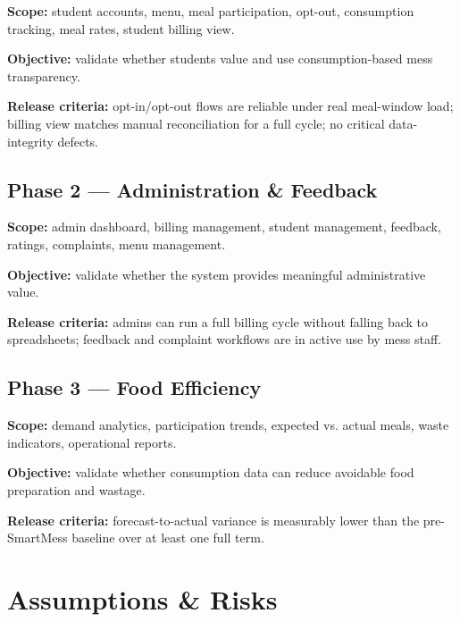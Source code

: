 \documentclass[12pt,a4paper]{article}
\begin{document}
\textbf{Scope:} student accounts, menu, meal participation, opt-out,
consumption tracking, meal rates, student billing view.

\textbf{Objective:} validate whether students value and use consumption-based
mess transparency.

\textbf{Release criteria:} opt-in/opt-out flows are reliable under real
meal-window load; billing view matches manual reconciliation for a full cycle;
no critical data-integrity defects.

\subsection*{Phase 2 --- Administration \& Feedback}

\textbf{Scope:} admin dashboard, billing management, student management,
feedback, ratings, complaints, menu management.

\textbf{Objective:} validate whether the system provides meaningful
administrative value.

\textbf{Release criteria:} admins can run a full billing cycle without falling
back to spreadsheets; feedback and complaint workflows are in active use by
mess staff.

\subsection*{Phase 3 --- Food Efficiency}

\textbf{Scope:} demand analytics, participation trends, expected vs. actual
meals, waste indicators, operational reports.

\textbf{Objective:} validate whether consumption data can reduce avoidable food
preparation and wastage.

\textbf{Release criteria:} forecast-to-actual variance is measurably lower than
the pre-SmartMess baseline over at least one full term.


\section{Assumptions \& Risks}
\end{document}
